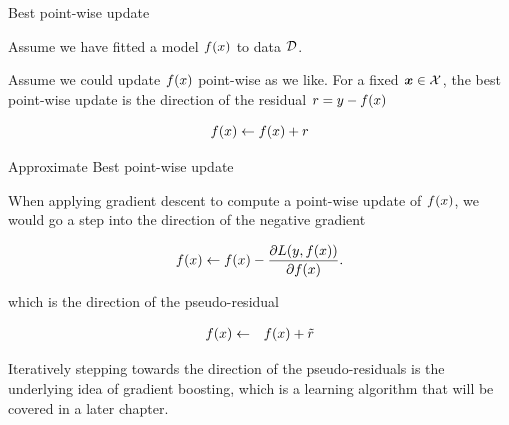 \begin{frame}[t]{Best point-wise update}

Assume we have fitted a model $f(x)$ to data $\mathcal{D}$. 

\lz 

Assume we could update $f(x)$ point-wise as we like. For a fixed $\bm{x} \in \mathcal{X}$, the best point-wise update is the direction of the residual $r = y - f(x)$

$$
	f(x) \leftarrow f(x) + r
$$


\begin{overlayarea}{\textwidth}{\textheight}
\begin{center}
\end{center}
\end{overlayarea} 

\end{frame}

\begin{vbframe}{Approximate Best point-wise update}

When applying gradient descent to compute a point-wise update of $f(x)$, we would go a step into the direction of the negative gradient

$$
	f(x) \leftarrow f(x) - \frac{\partial L(y, f(x))}{\partial f(x)}. 
$$

which is the direction of the pseudo-residual

\begin{eqnarray*}
	f(x) &\leftarrow& f(x) + \tilde r\\ 
\end{eqnarray*}

Iteratively stepping towards the direction of the pseudo-residuals is the underlying idea of gradient boosting, which is a learning algorithm that will be covered in a later chapter. 


\end{vbframe}


